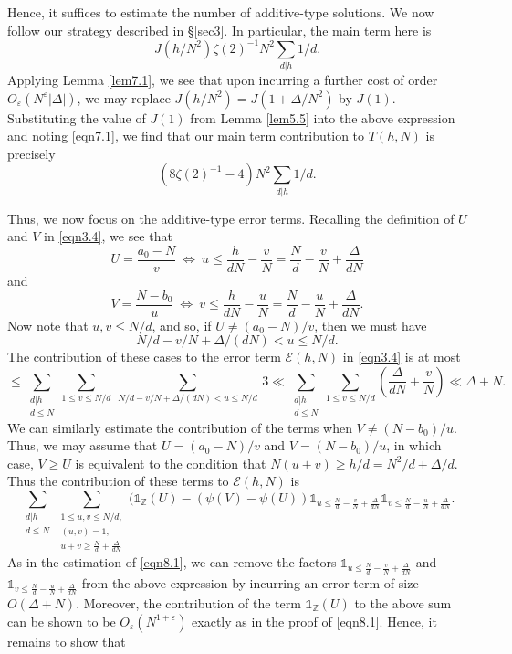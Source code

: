 \documentclass[12pt,reqno]{amsart}
\theoremstyle{definition}
\theoremstyle{remark}
\numberwithin{equation}{section}
\renewcommand{\geq}{\geqslant}
\renewcommand{\leq}{\leqslant}
\def\eps{\varepsilon}
\def \cE {\mathcal E}
\newcommand\1{\mathds{1}}
\begin{document}
 Hence, it suffices to estimate the number of additive-type solutions. We now follow our strategy described in \S\ref{sec3}. In particular, the main term here is 
\[ J(h/N^2) \zeta(2)^{-1}N^2\sum_{d|h}1/d. \]
Applying Lemma \ref{lem7.1}, we see that upon incurring a further cost of order $O_{\eps}(N^{\eps}|\Delta|)$, we may replace $J(h/N^2) = J(1 + \Delta/N^2)$ by $J(1)$. Substituting the value of $J(1)$ from Lemma \ref{lem5.5} into the above expression and noting \eqref{eqn7.1}, we find that our main term contribution to $T(h,N)$ is precisely
\[( 8\zeta(2)^{-1} - 4)N^2\sum_{d|h}1/d. \]

Thus, we now focus on the additive-type error terms. Recalling the definition of $U$ and $V$ in \eqref{eqn3.4}, we see that 
\[ U = \frac{a_0 - N}{v} \ \Leftrightarrow \ u \leq \frac{h}{dN} - \frac{v}{N} = \frac{N}{d} - \frac{v}{N} + \frac{\Delta}{dN} 
\]
and
\[ V = \frac{N- b_0}{u} \  \Leftrightarrow \ v \leq \frac{h}{dN} - \frac{u}{N} = \frac{N}{d} - \frac{u}{N} + \frac{\Delta}{dN} .  \]
Now note that $u, v \leq N/d$, and so, if $U \neq (a_0 - N)/v$, then we must have 
\[ N/d - v/N + \Delta/(dN) < u \leq N/d. \]
The contribution of these cases to the error term $\cE(h,N)$ in \eqref{eqn3.4} is at most
\begin{equation} \label{eqn8.1}
\leq \sum_{\substack{d|h \\ d \leqslant N}} \sum_{1 \leq v \leq N/d} \ \sum_{N/d - v/N + \Delta/(dN) < u \leq N/d} \  3 \ll  \sum_{\substack{d|h \\ d \leqslant N}} \sum_{1 \leq v \leq N/d} \left( \frac{\Delta}{dN} + \frac{v}{N} \right) \ll \Delta + N .
\end{equation}
We can similarly estimate the contribution of the terms when $V \neq (N - b_0)/u$. Thus, we may assume that $U = (a_0 - N)/v$ and $V = (N- b_0)/u$, in which case, $V \geq U$ is equivalent to the condition that $N(u + v) \geq h/d = N^2/d + \Delta/d$. Thus the contribution of these terms to $\cE(h,N)$ is 
\[ \sum_{\substack{d|h \\ d \leqslant N}} \sum_{\substack{1 \leq u,v \leq N/d,\\ (u,v) = 1, \\ u+ v \geq \frac{N}{d} + \frac{\Delta}{dN}}}(\1_{\mathbb{Z}}(U) - ( \psi(V) - \psi(U)) \1_{u \leq \frac{N}{d} - \frac{v}{N} + \frac{\Delta}{dN}} \1_{v \leq \frac{N}{d} - \frac{u}{N} + \frac{\Delta}{dN} }  . \]
As in the estimation of \eqref{eqn8.1}, we can remove the factors $\1_{u \leq \frac{N}{d} - \frac{v}{N} + \frac{\Delta}{dN}}$ and $\1_{v \leq \frac{N}{d} - \frac{u}{N} + \frac{\Delta}{dN} }$ from the above expression by incurring an error term of size $O(\Delta + N)$. Moreover, the contribution of the term $\1_{\mathbb{Z}}(U)$ to the above sum can be shown to be $O_{\eps}(N^{1 + \eps})$ exactly as in the proof of \eqref{eqn8.1}. Hence, it remains to show that
\end{document}
